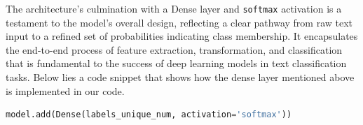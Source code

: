 The architecture's culmination with a Dense layer and \verb|softmax| activation is a testament to the model's overall design, reflecting a clear pathway from raw text input to a refined set of probabilities indicating class membership. It encapsulates the end-to-end process of feature extraction, transformation, and classification that is fundamental to the success of deep learning models in text classification tasks.
Below lies a code snippet that shows how the dense layer mentioned above is implemented in our code.
\begin{lstlisting}[language=Python]
model.add(Dense(labels_unique_num, activation='softmax'))	
\end{lstlisting}